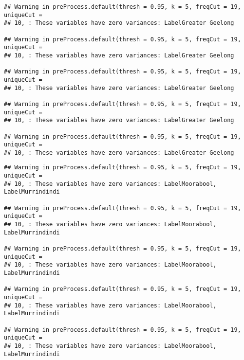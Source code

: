 \documentclass[
]{article}
\begin{document}
\begin{verbatim}
## Warning in preProcess.default(thresh = 0.95, k = 5, freqCut = 19, uniqueCut =
## 10, : These variables have zero variances: LabelGreater Geelong

## Warning in preProcess.default(thresh = 0.95, k = 5, freqCut = 19, uniqueCut =
## 10, : These variables have zero variances: LabelGreater Geelong

## Warning in preProcess.default(thresh = 0.95, k = 5, freqCut = 19, uniqueCut =
## 10, : These variables have zero variances: LabelGreater Geelong

## Warning in preProcess.default(thresh = 0.95, k = 5, freqCut = 19, uniqueCut =
## 10, : These variables have zero variances: LabelGreater Geelong

## Warning in preProcess.default(thresh = 0.95, k = 5, freqCut = 19, uniqueCut =
## 10, : These variables have zero variances: LabelGreater Geelong
\end{verbatim}

\begin{verbatim}
## Warning in preProcess.default(thresh = 0.95, k = 5, freqCut = 19, uniqueCut =
## 10, : These variables have zero variances: LabelMoorabool, LabelMurrindindi

## Warning in preProcess.default(thresh = 0.95, k = 5, freqCut = 19, uniqueCut =
## 10, : These variables have zero variances: LabelMoorabool, LabelMurrindindi

## Warning in preProcess.default(thresh = 0.95, k = 5, freqCut = 19, uniqueCut =
## 10, : These variables have zero variances: LabelMoorabool, LabelMurrindindi

## Warning in preProcess.default(thresh = 0.95, k = 5, freqCut = 19, uniqueCut =
## 10, : These variables have zero variances: LabelMoorabool, LabelMurrindindi

## Warning in preProcess.default(thresh = 0.95, k = 5, freqCut = 19, uniqueCut =
## 10, : These variables have zero variances: LabelMoorabool, LabelMurrindindi
\end{verbatim}
\end{document}

